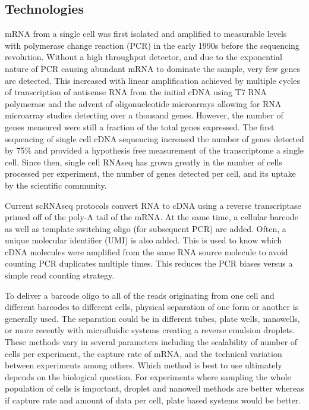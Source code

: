 \subsection{Technologies}

\par{
mRNA from a single cell was first isolated and amplified to measurable levels with polymerase change reaction (PCR)\cite{PCR}\cite{PCRPatent} in the early 1990s\cite{earliersinglecell} before the sequencing revolution. Without a high throughput detector, and due to the exponential nature of PCR causing abundant mRNA to dominate the sample, very few genes are detected. This increased with linear amplification achieved by multiple cycles of transcription of antisense RNA from the initial cDNA using T7 RNA polymerase\cite{T7amp} and the advent of oligonucleotide microarrays\cite{snpchip} allowing for RNA microarray studies detecting over a thousand genes\cite{microarrayRNA}\cite{microarraySC2}. However, the number of genes measured were still a fraction of the total genes expressed. The first sequencing of single cell cDNA sequencing increased the number of genes detected by 75\%\cite{first_singlecell} and provided a hypothesis free measurement of the transcriptome a single cell. Since then, single cell RNAseq has grown greatly in the number of cells processed per experiment, the number of genes detected per cell, and its uptake by the scientific community\cite{singlecellgrowth}.
}

\par{
Current scRNAseq protocols convert RNA to cDNA using a reverse transcriptase primed off of the poly-A tail of the mRNA. At the same time, a cellular barcode as well as template switching oligo (for subsequent PCR) are added. Often, a unique molecular identifier (UMI) is also added. This is used to know which cDNA molecules were amplified from the same RNA source molecule to avoid counting PCR duplicates multiple times\cite{UMI1}\cite{UMI2}. This reduces the PCR biases versus a simple read counting strategy. 
} 

\par{
To deliver a barcode oligo to all of the reads originating from one cell and different barcodes to different cells, physical separation of one form or another is generally used. The separation could be in different tubes, plate wells, nanowells\cite{seqwell}\cite{scalablemicro}\cite{combilabel}, or more recently with microfluidic systems creating a reverse emulsion droplets\cite{dropseq}\cite{Klein2015}\cite{10xsinglecell}. These methods vary in several parameters including the scalability of number of cells per experiment, the capture rate of mRNA, and the technical variation between experiments among others\cite{powersingle}\cite{singlecompare}\cite{singlecompare2}. Which method is best to use ultimately depends on the biological question. For experiments where sampling the whole population of cells is important, droplet and nanowell methods are better whereas if capture rate and amount of data per cell, plate based systems would be better. 
}

